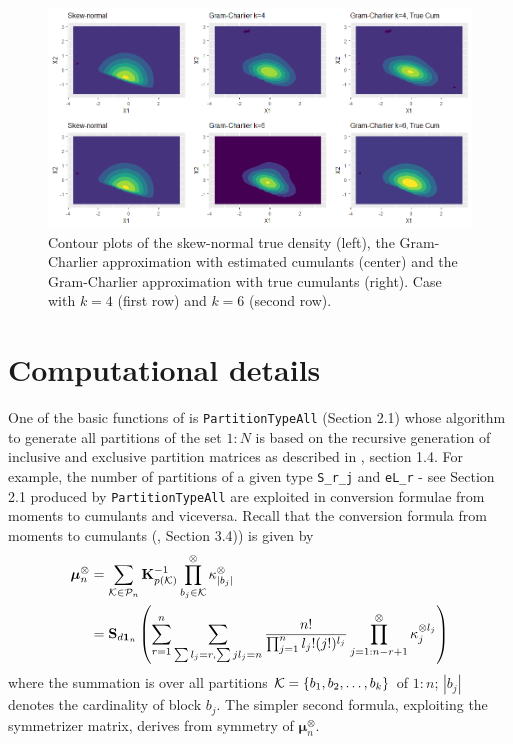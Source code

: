 \begin{figure}
\includegraphics[width=1\linewidth,height=0.5\textheight]{figures/GCALL} \caption{Contour plots of the skew-normal true density (left), the Gram-Charlier approximation with estimated cumulants (center) and the Gram-Charlier approximation with true cumulants (right). Case with $k=4$ (first row) and $k=6$ (second row).}\label{fig:Gram-Charlier}
\end{figure}

\hypertarget{computational-details}{%
\section{Computational details}\label{computational-details}}

One of the basic functions of  is \texttt{PartitionTypeAll} (Section 2.1) whose algorithm to generate all partitions of the set \(1:N\) is based on the recursive generation of inclusive and exclusive partition matrices as described in \citet{terdik2021multivariate}, section 1.4. For example, the number of partitions of a given type \texttt{S\_r\_j} and \texttt{eL\_r} - see Section 2.1 produced by \texttt{PartitionTypeAll} are exploited in conversion formulae from moments to cumulants and viceversa. Recall that the conversion formula from moments to cumulants (\citet{terdik2021multivariate}, Section 3.4)) is given by
\begin{equation}
\begin{split}
\boldsymbol{\mu}_{n}^\otimes &= \sum_{{\cal{K}} \in {\cal{P}}_n} \mathbf{K}^{-1}_{p({\cal{K}})} \prod^\otimes_{b_j \in {\cal{K}}} \kappa^\otimes_{|b_j|}\\
  &= \mathbf{S}_{d \mathbf{1}_n}\left( \sum_{r=1}^n \sum_{\sum l_j =r, \sum j l_j = n} \frac{n!}{\prod_{j=1}^n l_j! (j!)^{l_j}} \prod_{j=1:n-r+1}^\otimes \kappa^{\otimes l_j}_j\right)
\end{split}
\label{eq:mtc}
\end{equation}
where the summation is over all partitions \({\cal{K}} = \{b_1, b_2,\dots, b_k\}\) of \(1 : n\); \(|b_j|\) denotes the cardinality of block \(b_j\). The simpler second formula, exploiting the symmetrizer matrix, derives from symmetry of \(\boldsymbol{\mu}_{n}^\otimes\).

